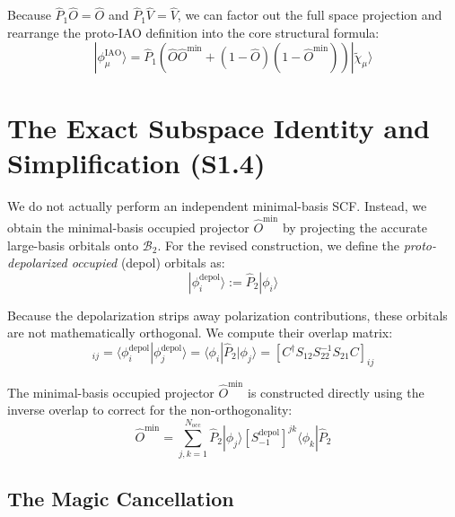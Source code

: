 \documentclass[11pt]{article}
\newcommand{\mnote}[1]{\marginpar{\linespread{1.1}\footnotesize\textsf{\textcolor{blue}{\textbf{Margin Note:} #1}}}}
\begin{document}
Because $\hat{P}_1\hat{O} = \hat{O}$ and $\hat{P}_1\hat{V} = \hat{V}$, we can factor out the full space projection and rearrange the proto-IAO definition into the core structural formula:
\begin{equation}
    |\phi_\mu^{\text{IAO}}\rangle = \hat{P}_1 (\hat{O}\hat{O}^{\text{min}} + (1 - \hat{O})(1 - \hat{O}^{\text{min}})) |\tilde{\chi}_\mu\rangle \label{eq:core_iao}
\end{equation}

\vspace{0.5cm}

\section{The Exact Subspace Identity and Simplification (S1.4)}

We do not actually perform an independent minimal-basis SCF. Instead, we obtain the minimal-basis occupied projector $\hat{O}^{\text{min}}$ by projecting the accurate large-basis orbitals onto $\mathcal{B}_2$. For the revised construction, we define the \textit{proto-depolarized occupied} (depol) orbitals as:
\begin{equation}
    |\phi_i^{\text{depol}}\rangle := \hat{P}_2 |\phi_i\rangle
\end{equation}


Because the depolarization strips away polarization contributions, these orbitals are not mathematically orthogonal. We compute their overlap matrix:
\begin{equation}
    [S^{\text{depol}}]_{ij} = \langle\phi_i^{\text{depol}} | \phi_j^{\text{depol}}\rangle = \langle\phi_i | \hat{P}_2 | \phi_j\rangle = [C^\dagger S_{12} S_{22}^{-1} S_{21} C]_{ij} \label{eq:Sdepol}
\end{equation}

The minimal-basis occupied projector $\hat{O}^{\text{min}}$ is constructed directly using the inverse overlap to correct for the non-orthogonality:
\begin{equation}
    \hat{O}^{\text{min}} = \sum_{j,k=1}^{N_{\text{occ}}} \hat{P}_2 |\phi_j\rangle [S^{\text{depol}}_{-1}]^{jk} \langle\phi_k| \hat{P}_2
\end{equation}

\subsection{The Magic Cancellation}
\end{document}
